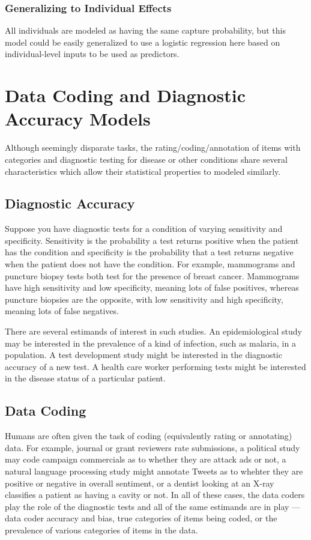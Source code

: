 \subsubsection{Generalizing to Individual Effects}

All individuals are modeled as having the same capture probability,
but this model could be easily generalized to use a logistic
regression here based on individual-level inputs to be used as
predictors.



\section{Data Coding and Diagnostic Accuracy Models}

Although seemingly disparate tasks, the rating/coding/annotation of
items with categories and diagnostic testing for disease or other
conditions share several characteristics which allow their statistical
properties to modeled similarly.

\subsection{Diagnostic Accuracy}

Suppose you have diagnostic tests for a condition of varying
sensitivity and specificity.  Sensitivity is the probability a test
returns positive when the patient has the condition and specificity is
the probability that a test returns negative when the patient does not
have the condition.  For example, mammograms and puncture biopsy tests
both test for the presence of breast cancer.  Mammograms have high
sensitivity and low specificity, meaning lots of false positives,
whereas puncture biopsies are the opposite, with low sensitivity and
high specificity, meaning lots of false negatives.

There are several estimands of interest in such studies.  An
epidemiological study may be interested in the prevalence of a kind of
infection, such as malaria, in a population.  A test development study
might be interested in the diagnostic accuracy of a new test. A health
care worker performing tests might be interested in the disease status
of a particular patient.

\subsection{Data Coding}

Humans are often given the task of coding (equivalently rating or
annotating) data.  For example, journal or grant reviewers rate
submissions, a political study may code campaign commercials as to
whether they are attack ads or not, a natural language processing
study might annotate Tweets as to whehter they are positive or
negative in overall sentiment, or a dentist looking at an X-ray
classifies a patient as having a cavity or not.  In all of these
cases, the data coders play the role of the diagnostic tests and all
of the same estimands are in play --- data coder accuracy and bias,
true categories of items being coded, or the prevalence of various
categories of items in the data.

